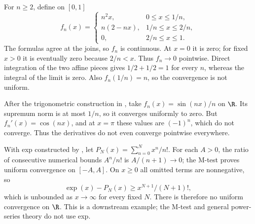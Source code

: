 \begin{example}
For $n\geq2$, define on $[0,1]$
\[f_n(x)=\begin{cases}n^2x,&0\leq x\leq1/n,\\ n(2-nx),&1/n\leq x\leq2/n,\\0,&2/n\leq x\leq1.\end{cases}\]
The formulas agree at the joins, so $f_n$ is continuous. At $x=0$ it is zero; for fixed $x>0$ it is eventually zero because $2/n<x$. Thus $f_n\to0$ pointwise. Direct integration of the two affine pieces gives $1/2+1/2=1$ for every $n$, whereas the integral of the limit is zero. Also $f_n(1/n)=n$, so the convergence is not uniform.
\end{example}

\begin{example}
After the trigonometric construction in , take $f_n(x)=\sin(nx)/n$ on $\R$. Its supremum norm is at most $1/n$, so it converges uniformly to zero. But $f_n'(x)=\cos(nx)$, and at $x=\pi$ these values are $(-1)^n$, which do not converge. Thus the derivatives do not even converge pointwise everywhere.
\end{example}

\begin{example}
With exp constructed by , let $P_N(x)=\sum_{n=0}^Nx^n/n!$. For each $A>0$, the ratio of consecutive numerical bounds $A^n/n!$ is $A/(n+1)\to0$; the M-test proves uniform convergence on $[-A,A]$. On $x\geq0$ all omitted terms are nonnegative, so
\[\exp(x)-P_N(x)\geq x^{N+1}/(N+1)!,\]
which is unbounded as $x\to\infty$ for every fixed $N$. There is therefore no uniform convergence on $\R$. This is a downstream example; the M-test and general power-series theory do not use exp.
\end{example}
